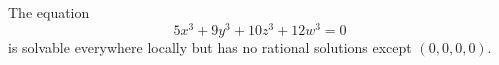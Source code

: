 \begin{proposition}\label{eq:049}
    The equation
\[
    5x^3+9y^3+10z^3+12w^3=0
\]
    is solvable everywhere locally but has no rational solutions except $(0,0,0,0)$.
\end{proposition}
